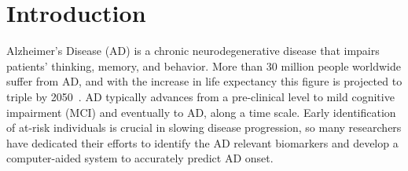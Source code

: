 
\fi

\section{Introduction}
Alzheimer's Disease (AD) is a chronic neurodegenerative disease that impairs patients' thinking, memory, and behavior. More than 30 million people worldwide suffer from AD, and with the increase in life expectancy this figure is projected to triple by 2050~\cite{barnes2011projected}. AD typically advances from a pre-clinical level to mild cognitive impairment (MCI) and eventually to AD, along a time scale. Early identification of at-risk individuals is crucial in slowing disease progression, so many researchers have dedicated their efforts to identify the AD relevant biomarkers and develop a computer-aided system to accurately predict AD onset.

